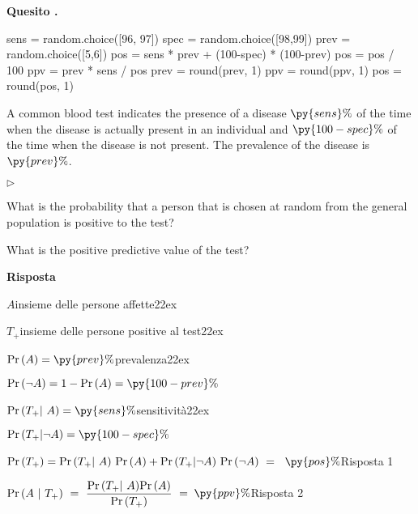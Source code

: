 \documentclass[11pt,twoside,a4paper]{article}
\newcommand{\mylabel}[1]{#1\hfill}
\renewenvironment{itemize}
  {\begin{list}{$\triangleright$}{%
   \setlength{\parskip}{0mm}
   \setlength{\topsep}{.4\baselineskip}
   \setlength{\rightmargin}{0mm}
   \setlength{\listparindent}{0mm}
   \setlength{\itemindent}{0mm}
   \setlength{\labelwidth}{2ex}
   \setlength{\itemsep}{.4\baselineskip}
   \setlength{\parsep}{0mm}
   \setlength{\partopsep}{0mm}
   \setlength{\labelsep}{1ex}
   \setlength{\leftmargin}{\labelwidth+\labelsep}
   \let\makelabel\mylabel}}{%
   \end{list}\vspace*{-1.3mm}}
\def\Pr{{\rm Pr\,}}
\newcounter{quesito}
\newenvironment{question}{\bigskip\addtocounter{quesito}{1}\par\textbf{Quesito \thequesito.}}{\vspace{\parskip}}
\newenvironment{answer}{\par\textbf{Risposta\quad}}{\vspace{\parskip}}
\begin{document}
\begin{question}
\def\Pr{{\rm Pr\,}}
\begin{pycode}
sens = random.choice([96, 97])
spec = random.choice([98,99])
prev = random.choice([5,6])
pos =  sens * prev + (100-spec) * (100-prev)
pos = pos / 100
ppv =  prev * sens  / pos
prev = round(prev, 1)
ppv = round(ppv, 1)
pos = round(pos, 1)
\end{pycode}
A common blood test indicates the presence of a disease $\py{sens}\%$ of the time when the disease is actually present in an individual and $\py{100-spec}\%$ of the time when the disease is not present. The prevalence of the disease is $\py{prev}\%$.
\begin{itemize}
\item[1.] What is the probability that a person that is chosen at random from the general population is positive to the test?
\item[2.] What is the positive predictive value of the test? 
\end{itemize}
\begin{answer}

$A$\hfill insieme delle persone affette\kern22ex

$T_+$\hfill insieme delle persone positive al test\kern22ex

$\Pr(A)=\py{prev}\%$\hfill prevalenza\kern22ex

$\Pr(\neg A)=1-\Pr(A)=\py{100-prev}\%$

$\Pr(T_+|~ A)=\py{sens}\%$\hfill sensitività\kern22ex

$\Pr(T_+|\neg A)=\py{100-spec}\%$

$\Pr(T_+)=\Pr(T_+|~A)\ \Pr(A) + \Pr(T_+|\neg A)\ \Pr(\neg A)\ =\kern1ex${\color{blue} $\py{pos}\%$\hfill Risposta 1}

$\displaystyle\Pr(A ~|~T_+)\ =\ \frac{\Pr(T_+|~A)\Pr(A)}{\Pr(T_+)}\ =\kern1ex${\color{blue}$\py{ppv}\%$\hfill Risposta 2}

\end{answer}
\end{question}
\end{document}

